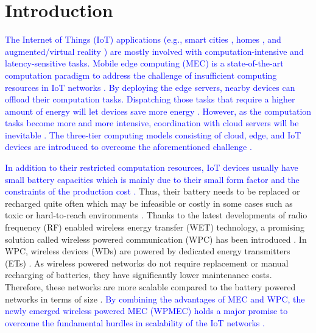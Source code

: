 \documentclass[12pt,draftclsnofoot,onecolumn]{IEEEtran}
\begin{document}
\section{Introduction}
\textcolor{blue}{The Internet of Things (IoT) applications (e.g., smart cities \cite{b1}, homes \cite{b3}, and augmented/virtual reality \cite{b11}) are mostly involved with computation-intensive and latency-sensitive tasks. Mobile edge computing (MEC) is a state-of-the-art computation paradigm to address the challenge of insufficient computing resources in IoT networks \cite{b35, b4}. By deploying the edge servers, nearby devices can offload their computation tasks. Dispatching those tasks that require a higher amount of energy will let devices save more energy \cite{b38}. However, as the computation tasks become more and more intensive, coordination with cloud servers will be inevitable \cite{b37}. The three-tier computing models consisting of cloud, edge, and IoT devices are introduced to overcome the aforementioned challenge \cite{b5,b6,b39,b40}.}

\textcolor{blue}{In addition to their restricted computation resources, IoT devices usually have small battery capacities which is mainly due to their small form factor and the constraints of the production cost \cite{b1}.} Thus, their battery needs to be replaced or recharged quite often which may be infeasible or costly in some cases such as toxic \cite{b7} or hard-to-reach environments \cite{b4}. Thanks to the latest developments of radio frequency (RF) enabled wireless energy transfer (WET) technology, a promising solution called wireless powered communication (WPC) has been introduced \cite{b8}. In WPC, wireless devices (WDs) are powered by dedicated energy transmitters (ETs) \cite{b8}. As wireless powered networks do not require replacement or manual recharging of batteries, they have significantly lower maintenance costs. Therefore, these networks are more scalable compared to the battery powered networks in terms of size \cite{b8}. \textcolor{blue}{By combining the advantages of MEC and WPC, the newly emerged wireless powered MEC (WPMEC) holds a major promise to overcome the fundamental hurdles in scalability of the IoT networks \cite{b9,b10,b30,b33}.}
\end{document}
